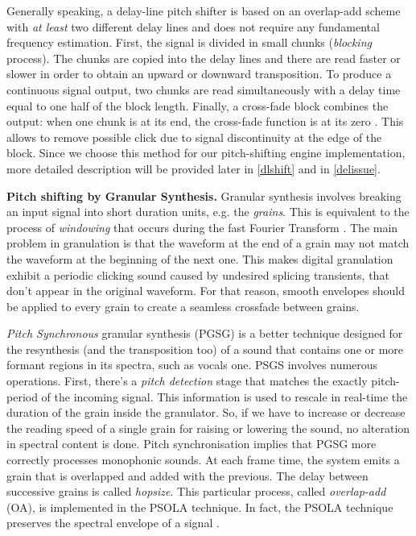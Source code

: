 Generally speaking, a delay-line pitch shifter is based on an overlap-add scheme with \emph{at least} two different delay lines and does not require any fundamental frequency estimation. First, the signal is divided in small chunks (\emph{blocking} process). The chunks are copied into the delay lines and there are read faster or slower in order to obtain an upward or downward transposition. To produce a continuous signal output, two chunks are read simultaneously with a delay time equal to one half of the block length. Finally, a cross-fade block combines the output: when one chunk is at its end, the cross-fade function is at its zero \cite{zolder2011dafx}. This allows to remove possible click due to signal discontinuity at the edge of the block. Since we choose this method for our pitch-shifting engine implementation, more detailed description will be provided later in \ref{dlshift} and in \ref{delissue}.

\textbf{Pitch shifting by Granular Synthesis.}
Granular synthesis involves breaking an input signal into short duration units, e.g. the \emph{grains}. This is equivalent to the process of \emph{windowing} that occurs during the fast Fourier Transform \cite{roads1996tutorial}. 
The main problem in granulation is that the waveform at the end of a grain may not match the waveform at the beginning of the next one. This makes digital granulation exhibit a periodic clicking sound caused by undesired splicing transients, that don't appear in the original waveform.
For that reason, smooth envelopes should be applied to every grain to create a seamless crossfade between grains.

\emph{Pitch Synchronous} granular synthesis (PGSG) is a better technique designed for the resynthesis (and the transposition too) of a sound that contains one or more formant regions in its spectra, such as vocals one. PSGS involves numerous operations. First, there's a \emph{pitch detection} stage that matches the exactly pitch-period of the incoming signal. This information is used to rescale in real-time the duration of the grain inside the granulator. So, if we have to increase or decrease the reading speed of a single grain for raising or lowering the sound, no alteration in spectral content is done. Pitch synchronisation implies that PGSG more correctly processes monophonic sounds. At each frame time, the system emits a grain that is overlapped and added with the previous. The delay between successive grains is called \emph{hopsize}. This particular process, called \emph{overlap-add} (OA), is implemented in the PSOLA technique. In fact, the PSOLA technique preserves the spectral envelope of a signal \cite{moulines1995non}. 


